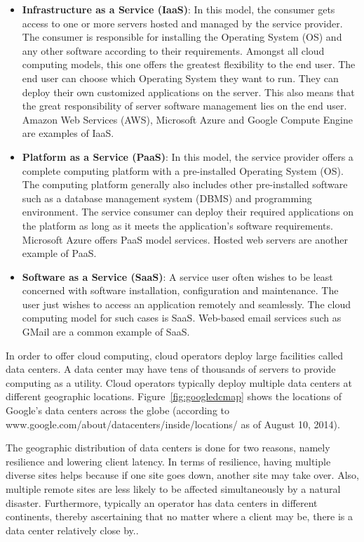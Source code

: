 \begin{itemize}
\item \textbf{Infrastructure as a Service (IaaS)}: In this model, the consumer gets access to one or more servers hosted and managed by the service provider. The consumer is responsible for installing the Operating System (OS) and any other software according to their requirements. Amongst all cloud computing models, this one offers the greatest flexibility to the end user. The end user can choose which Operating System they want to run. They can deploy their own customized applications on the server. This also means that the great responsibility of server software management lies on the end user. Amazon Web Services (AWS), Microsoft Azure and Google Compute Engine are examples of IaaS.
\item \textbf{Platform as a Service (PaaS)}: In this model, the service provider offers a complete computing platform with a pre-installed Operating System (OS). The computing platform generally also includes other pre-installed software such as a database management system (DBMS) and programming environment. The service consumer can deploy their required applications on the platform as long as it meets the application's software requirements. Microsoft Azure offers PaaS model services. Hosted web servers are another example of PaaS.
\item \textbf{Software as a Service (SaaS)}: A service user often wishes to be least concerned with software installation, configuration and maintenance. The user just wishes to access an application remotely and seamlessly. The cloud computing model for such cases is SaaS. Web-based email services such as GMail are a common example of SaaS.
\end{itemize}

In order to offer cloud computing, cloud operators deploy large facilities called data centers. A data center may have tens of thousands of servers to provide computing as a utility. Cloud operators typically deploy multiple data centers at different geographic locations. Figure~\ref{fig:googledcmap} shows the locations of Google's data centers across the globe (according to www.google.com/about/datacenters/inside/locations/ as of August 10, 2014).

The geographic distribution of data centers is done for two reasons, namely resilience and lowering client latency. In terms of resilience, having multiple diverse sites helps because if one site goes down, another site may take over. Also, multiple remote sites are less likely to be affected simultaneously by a natural disaster. Furthermore, typically an operator has data centers in different continents, thereby ascertaining that no matter where a client may be, there is a data center relatively close by.. 

